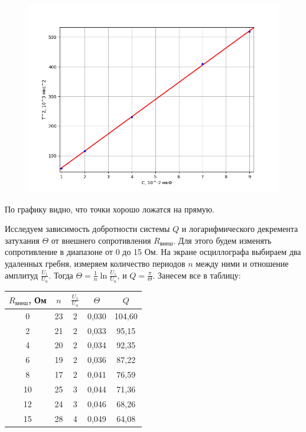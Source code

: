 \documentclass[a4paper,12pt]{article} %
\begin{document}
\begin{figure}[h!]
	\centering
	\includegraphics[scale=0.85]{T^2(C).png}
\end{figure}

По графику видно, что точки хорошо ложатся на прямую.
\vspace{7mm}

Исследуем зависимость добротности системы $Q$ и логарифмического декремента затухания $\Theta$ от внешнего сопротивления $R_{\text{внеш}}$. Для этого будем изменять сопротивление в диапазоне от 0 до 15 Ом. На экране осциллографа выбираем два удаленных гребня, измеряем количество периодов $n$ между ними и отношение амплитуд $\frac{U_1}{U_n}$. Тогда $\Theta = \frac{1}{n}\ln\frac{U_1}{U_n}$, и $Q = \frac{\pi}{\Theta}$. Занесем все в таблицу:

\begin{table}[h!]
	\centering
	\begin{tabular}{|c|c|c|c|c|}
		\hline
		$R_{\text{внеш}}$, Ом & $n$ & $\frac{U_1}{U_n}$ & $\Theta$ & $Q$      \\ \hline
		0                     & 23  & 2                 & 0,030    & 104,60 \\ \hline
		2                     & 21  & 2                 & 0,033    & 95,15  \\ \hline
		4                     & 20  & 2                 & 0,034    & 92,35  \\ \hline
		6                     & 19  & 2                 & 0,036    & 87,22  \\ \hline
		8                     & 17  & 2                 & 0,041    & 76,59  \\ \hline
		10                    & 25  & 3                 & 0,044    & 71,36  \\ \hline
		12                    & 24  & 3                 & 0,046    & 68,26  \\ \hline
		15                    & 28  & 4                 & 0,049    & 64,08  \\ \hline
	\end{tabular}
\end{table}
\end{document}
